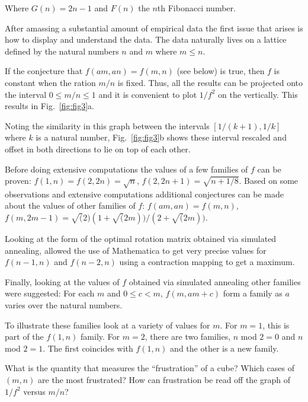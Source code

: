 \documentclass[superscriptaddress,reprint,amsmath,amssymb,aps]{revtex4-1}
\begin{document}
Where $G(n) = 2n-1$ and $F(n)$ the $n$th Fibonacci number.

\vspace{0.15in}

After amassing a substantial amount of empirical data the first issue that
arises is how to display and understand the data.  The data naturally lives on
a lattice defined by the natural numbers $n$ and $m$ where $m \le n$.

If the conjecture that $f(am,an) = f(m,n)$ (see below) is true, then $f$ is
constant when the ration $m/n$ is fixed.  Thus, all the results can be
projected onto the interval $0 \le m/n \le 1$ and it is convenient to plot
$1/f^2$ on the vertically.  This results in Fig.~\ref{fig:fig3}a.

Noting the similarity in this graph between the intervals $[1/(k+1),1/k]$
where $k$ is a natural number, Fig.~\ref{fig:fig3}b shows these interval
rescaled and offset in both directions to lie on top of each other.

Before doing extensive computations the values of a few families of $f$ can be
proven: $f(1,n) = f(2,2n) = \sqrt{n}$, $f(2,2n+1) = \sqrt{n+1/8}$.  Based on
some observations and extensive computations additional conjectures can be
made about the values of other families of $f$:  $f(am,an) = f(m,n)$,
$f(m,2m-1) = \sqrt(2) (1+\sqrt(2m))/(2+\sqrt(2m))$.

Looking at the form of the optimal rotation matrix obtained via simulated
annealing, allowed the use of Mathematica to get very precise values for
$f(n-1,n)$ and $f(n-2,n)$ using a contraction mapping to get a maximum.

Finally, looking at the values of $f$ obtained via simulated annealing other
families were suggested:  For each $m$ and $0 \le c < m$, $f(m,am+c)$ form a
family as $a$ varies over the natural numbers.

To illustrate these families look at a variety of values for $m$.  For $m = 1$,
this is part of the $f(1,n)$ family.  For $m = 2$, there are two families, $n$
mod $2 = 0$ and $n$ mod $2 = 1$.  The first coincides with $f(1,n)$ and the
other is a new family.

\vspace{0.15in}

What is the quantity that measures the ``frustration'' of a cube?  Which
cases of $(m,n)$ are the most frustrated?  How can frustration be read off
the graph of $1/f^2$ versus $m/n$?
\end{document}
